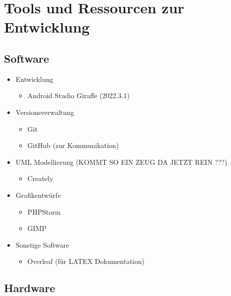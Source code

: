 \documentclass[oneside, ngerman]{sdqtechreport}
\begin{document}
\chapter{Tools und Ressourcen zur Entwicklung}
\label{chap:Entwicklungsumgebung}

\section{Software}
\label{sec:Entwicklungsumgebung:Software}

\begin{itemize}
    \item Entwicklung
    \begin{itemize}
        \item Android Studio Giraffe (2022.3.1)
    \end{itemize}
    
    \item Versionsverwaltung
    \begin{itemize}
        \item Git
        \item GitHub (zur Kommunikation)
    \end{itemize}

    \item UML Modellierung (KOMMT SO EIN ZEUG DA JETZT REIN ???)
    \begin{itemize}
        \item Creately
    \end{itemize}

    \item Grafikentwürfe
    \begin{itemize}
        \item PHPStorm
        \item GIMP
    \end{itemize}

    \item Sonstige Software
    \begin{itemize}
        \item Overleaf (für LATEX Dokumentation)
    \end{itemize}
    
\end{itemize}

\section{Hardware}
\label{sec:Entwicklungsumgebung:Hardware}
\end{document}

